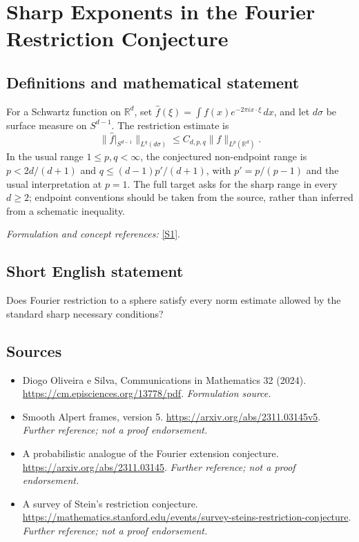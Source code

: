 \documentclass[11pt]{article}
\begin{document}
\section*{\texorpdfstring{Sharp Exponents in the Fourier Restriction Conjecture}{Sharp Exponents in the Fourier Restriction Conjecture}}\label{statement}
\subsection{Definitions and mathematical statement}
For a Schwartz function on ${\mathbb{R}}^d$, set $\widehat f(\xi)=\int f(x)e^{-2\pi i x\cdot\xi}\,dx$, and let $d\sigma$ be surface measure on $S^{d-1}$. The restriction estimate is
\[
 \|\widehat f|_{S^{d-1}}\|_{L^q(d\sigma)}\le C_{d,p,q}\|f\|_{L^p({\mathbb{R}}^d)}.
\]
In the usual range $1\le p,q<\infty$, the conjectured non-endpoint range is $p<2d/(d+1)$ and $q\le (d-1)p'/(d+1)$, with $p'=p/(p-1)$ and the usual interpretation at $p=1$. The full target asks for the sharp range in every $d\ge2$; endpoint conventions should be taken from the source, rather than inferred from a schematic inequality.
\par\smallskip\textit{Formulation and concept references:} \href{https://cm.episciences.org/13778/pdf}{[S1]}.

\subsection{Short English statement}
Does Fourier restriction to a sphere satisfy every norm estimate allowed by the standard sharp necessary conditions?
\subsection{Sources}
\begin{itemize}
\item[S1]Diogo Oliveira e Silva, Communications in Mathematics 32 (2024).
\url{https://cm.episciences.org/13778/pdf}.
\textit{Formulation source.}
\item[S2]Smooth Alpert frames, version 5.
\url{https://arxiv.org/abs/2311.03145v5}.
\textit{Further reference; not a proof endorsement.}
\item[S3]A probabilistic analogue of the Fourier extension conjecture.
\url{https://arxiv.org/abs/2311.03145}.
\textit{Further reference; not a proof endorsement.}
\item[S4]A survey of Stein's restriction conjecture.
\url{https://mathematics.stanford.edu/events/survey-steins-restriction-conjecture}.
\textit{Further reference; not a proof endorsement.}
\end{itemize}
\end{document}
